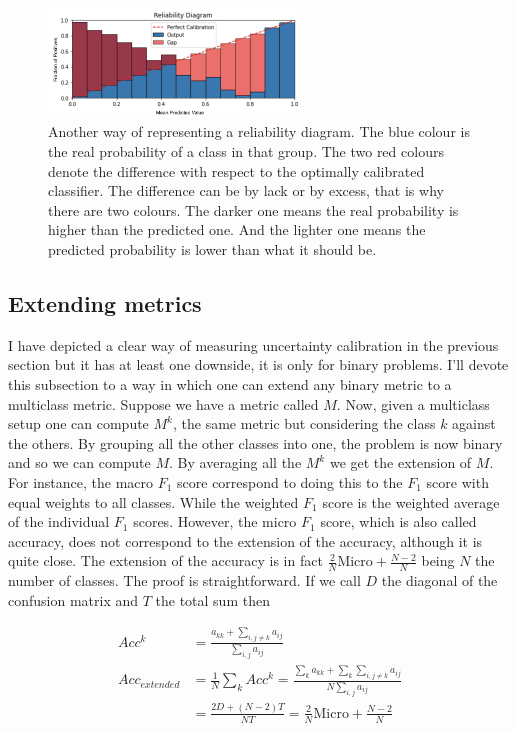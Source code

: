 \begin{figure}[ht]
    \centering
    \includegraphics[width=0.6\textwidth]{imgs/rel2.png}
    \caption{Another way of representing a reliability diagram. The blue colour is the real probability of a class in that group. The two red colours denote the difference with respect to the optimally calibrated classifier. The difference can be by lack or by excess, that is why there are two colours. The darker one means the real probability is higher than the predicted one. And the lighter one means the predicted probability is lower than what it should be.}
    \label{fig:rel2}
\end{figure}

\subsection{Extending metrics}

I have depicted a clear way of measuring uncertainty calibration in the previous section but it has at least one downside, it is only for binary problems. I'll devote this subsection to a way in which one can extend any binary metric to a multiclass metric. Suppose we have a metric called $M$.  Now, given a multiclass setup one can compute $M^k$, the same metric but considering the class $k$ against the others. By grouping all the other classes into one, the problem is now binary and so we can compute $M$. By averaging all the $M^k$ we get the extension of $M$. For instance, the macro $F_1$ score correspond to doing this to the $F_1$ score with equal weights to all classes. While the weighted $F_1$ score is the weighted average of the individual $F_1$ scores. However, the micro $F_1$ score, which is also called accuracy, does not correspond to the extension of the accuracy, although it is quite close. The extension of the accuracy is in fact $\frac{2}{N} \text{Micro} + \frac{N-2}{N}$ being $N$ the number of classes. The proof is straightforward. If we call $D$ the diagonal of the confusion matrix and $T$ the total sum then

\begin{align}
    Acc^k &= \frac{a_{kk} + \sum_{i,j \neq k} a_{ij}}{\sum_{i,j}a_{ij}} \\
    Acc_{extended} &= \frac{1}{N} \sum_{k} Acc^k = \frac{\sum_{k}a_{kk} + \sum_{k} \sum_{i,j\neq k} a_{ij}}{N \sum_{i,j}a_{ij}} \\
    &= \frac{2D + (N-2) T}{N T} = \frac{2}{N} \text{Micro} + \frac{N-2}{N}
\end{align}

